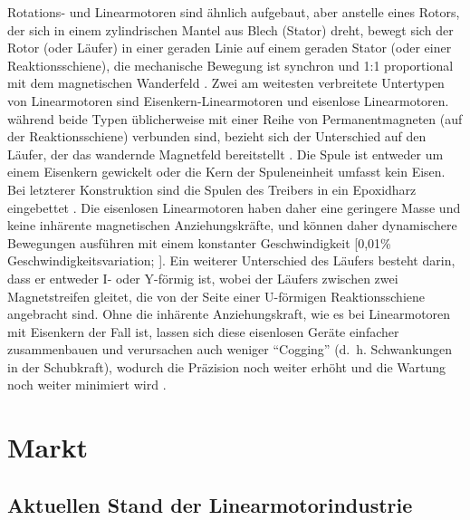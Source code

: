 \documentclass[
  oneside]{book}
\begin{document}
Rotations- und Linearmotoren sind ähnlich aufgebaut, aber anstelle eines Rotors, der sich in einem zylindrischen Mantel aus Blech (Stator) dreht, bewegt sich der Rotor (oder Läufer) in einer geraden Linie auf einem geraden Stator (oder einer Reaktionsschiene), die mechanische Bewegung ist synchron und 1:1 proportional mit dem magnetischen Wanderfeld \citep{gieras2018}. Zwei am weitesten verbreitete Untertypen von Linearmotoren sind Eisenkern-Linearmotoren und eisenlose Linearmotoren. während beide Typen üblicherweise mit einer Reihe von Permanentmagneten (auf der Reaktionsschiene) verbunden sind, bezieht sich der Unterschied auf den Läufer, der das wandernde Magnetfeld bereitstellt \citep{chou2016, gieras2018}. Die Spule ist entweder um einem Eisenkern gewickelt oder die Kern der Spuleneinheit umfasst kein Eisen. Bei letzterer Konstruktion sind die Spulen des Treibers in ein Epoxidharz eingebettet \citep{collins2016, gieras2018}. Die eisenlosen Linearmotoren haben daher eine geringere Masse und keine inhärente magnetischen Anziehungskräfte, und können daher dynamischere Bewegungen ausführen mit einem konstanter Geschwindigkeit {[}0,01\% Geschwindigkeitsvariation; \citet{collins2016}{]}. Ein weiterer Unterschied des Läufers besteht darin, dass er entweder I- oder Y-förmig ist, wobei der Läufers zwischen zwei Magnetstreifen gleitet, die von der Seite einer U-förmigen Reaktionsschiene angebracht sind. Ohne die inhärente Anziehungskraft, wie es bei Linearmotoren mit Eisenkern der Fall ist, lassen sich diese eisenlosen Geräte einfacher zusammenbauen und verursachen auch weniger ``Cogging'' (d.~h. Schwankungen in der Schubkraft), wodurch die Präzision noch weiter erhöht und die Wartung noch weiter minimiert wird \citep{collins2016} .

\hypertarget{markt}{%
\section{Markt}\label{markt}}

\hypertarget{aktuellen-stand-der-linearmotorindustrie}{%
\subsection{Aktuellen Stand der Linearmotorindustrie}\label{aktuellen-stand-der-linearmotorindustrie}}
\end{document}

